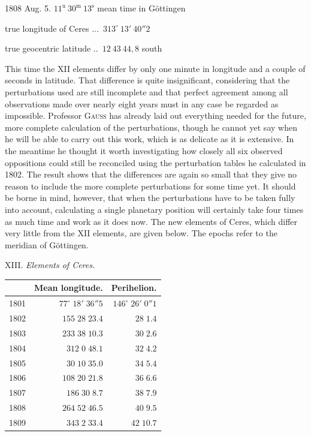 \begin{center} 1808 Aug. 5. \quad $11^{\text{u}}\ 30^{\text{m}}\ 13^{\text{s}}$ mean time in Göttingen

true longitude of Ceres .\;.\;.\;\ $313^\circ\ 13'\ 40''2$

true geocentric latitude .\;.\;\ $12\ 43\ 44{,}8$ south
\end{center}

\par\indent This time the XII elements differ by only one minute in longitude and a couple of seconds in latitude. That difference is quite insignificant, considering that the perturbations used are still incomplete and that perfect agreement among all observations made over nearly eight years must in any case be regarded as impossible. Professor \textsc{Gauss} has already laid out everything needed for the future, more complete calculation of the perturbations, though he cannot yet say when he will be able to carry out this work, which is as delicate as it is extensive. In the meantime he thought it worth investigating how closely all six observed oppositions could still be reconciled using the perturbation tables he calculated in 1802. The result shows that the differences are again so small that they give no reason to include the more complete perturbations for some time yet. It should be borne in mind, however, that when the perturbations have to be taken fully into account, calculating a single planetary position will certainly take four times as much time and work as it does now. The new elements of Ceres, which differ very little from the XII elements, are given below. The epochs refer to the meridian of Göttingen.

\begin{center} XIII. \emph{Elements of Ceres.}
\end{center}


\begin{center}\fontsize{10}{12}\selectfont\setlength{\tabcolsep}{5pt}\renewcommand{\arraystretch}{1.15}\begin{tabular}{crr}  & Mean longitude. & Perihelion.\\\hline 1801 & $77^\circ\;18'\;36''5$ & $146^\circ\;26'\;0''1$\\ 1802 & $155\;28\;23.4$ & $\phantom{146}\;28\;1.4$\\ 1803 & $233\;38\;10.3$ & $\phantom{146}\;30\;2.6$\\ 1804 & $312\;0\;48.1$ & $\phantom{146}\;32\;4.2$\\ 1805 & $30\;10\;35.0$ & $\phantom{146}\;34\;5.4$\\ 1806 & $108\;20\;21.8$ & $\phantom{146}\;36\;6.6$\\ 1807 & $186\;30\;8.7$ & $\phantom{146}\;38\;7.9$\\ 1808 & $264\;52\;46.5$ & $\phantom{146}\;40\;9.5$\\ 1809 & $343\;2\;33.4$ & $\phantom{146}\;42\;10.7$\\
\end{tabular}\end{center}

